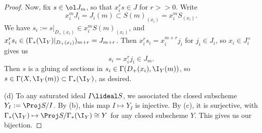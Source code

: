 \documentclass[12pt]{amsart}
\begin{document}
\begin{proof}
  Now, fix $s\in \ol J_m$, so that $x_i^rs\in J$ for $r>>0$.
  Write
  \[
    x_i^mJ_i=J_i(m)\subset S(m)_{(x_i)}=x_i^m S_{(x_i)}.
  \] 
  We have $s_i:=s|_{D_+(x_i)}\in x_i^mS(m)_{(x_i)}$, and $x_i^rs_i \in (\Gamma_*(\I_Y)|_{D_+(x_i)})_{m+r}=J_{m+r}$.
  Then $x_i^rs_i=x_i^{m+r}j_i$ for $j_i\in J_i$, so $x_i\in J_i^\times$ gives us
  \[
    s_i=x_i^rj_i\in J_m.
  \] 
  Then $s$ is a gluing of sections in $s_i\in\Gamma(D_+(x_i),\I_Y(m))$, so $s\in \Gamma(X,\I_Y(m))\subset \Gamma_*(\I_Y)$, as desired.

  (d) To any saturated ideal $I\lideal S$, we associated the closed subscheme $Y_I:=\Proj S/I$.
  By (b), this map $I\mapsto Y_I$ is injective.
  By (c), it is surjective, with $\Gamma_*(\I_Y)\mapsto \Proj S/\Gamma_*(\I_Y)\cong Y$ for any closed subscheme $Y$.
  This gives us our bijection.
  
\end{proof}
\end{document}
